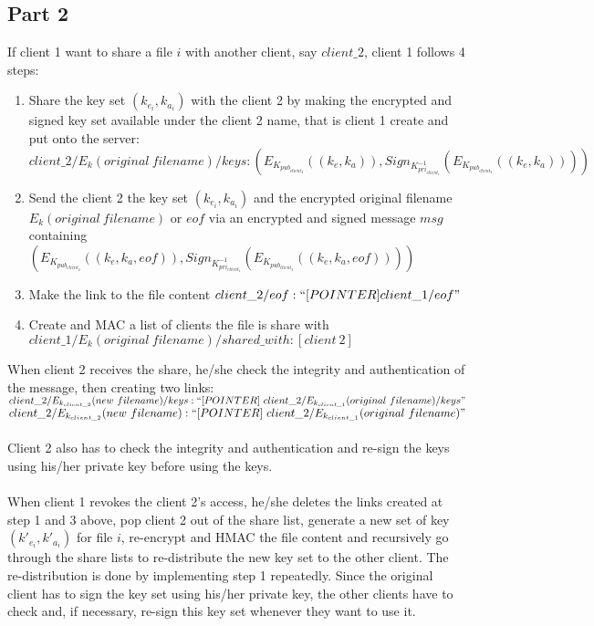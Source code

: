 \documentclass[a4paper, 11pt]{article}
\begin{document}
\subsection*{Part 2}
If client 1 want to share a file $i$ with another client, say $client\_2$, client 1 follows 4 steps:
%
\begin{enumerate}
	\item Share the key set $(k_{e_i},k_{a_i})$ with the client 2 by making the encrypted and signed key set available under the client 2 name, that is client 1 create and put onto the server:\\
	$client\_2/E_k(original\ filename)/keys : \left(E_{K_{pub_{client_2}}}((k_e, k_a)), Sign_{K^{-1}_{pri_{client_1}}}(E_{K_{pub_{client_2}}}((k_e, k_a)))\right)$
	\item Send the client 2 the key set $(k_{e_i},k_{a_i})$ and the encrypted original filename 	$E_k(original\ filename)$ or $eof$ via an encrypted and signed message $msg$ containing\\ $\left(E_{K_{pub_{client_2}}}((k_e, k_a, eof)), Sign_{K^{-1}_{pri_{client_1}}}(E_{K_{pub_{client_2}}}((k_e, k_a, eof)))\right)$
	\item Make the link to the file content $client\_2/eof : ``[POINTER] client\_1/eof"$
	\item Create and MAC a list of clients the file is share with\\
	$client\_1/E_k(original\ filename)/shared\_with : [client\ 2]$
\end{enumerate}
%
When client 2 receives the share, he/she check the integrity and authentication of the message, then creating two links:\\
$client\_2/E_{k_{client\_2}}(new\ filename)/keys : ``[POINTER]\ client\_2/E_{k_{client\_1}}(original\ filename)/keys"$\\
$client\_2/E_{k_{client\_2}}(new\ filename) : ``[POINTER]\ client\_2/E_{k_{client\_1}}(original\ filename)"$\\
\\
Client 2 also has to check the integrity and authentication and re-sign the keys using his/her private key before using the keys.\\
\\
When client 1 revokes the client 2's access, he/she deletes the links created at step 1 and 3 above, pop client 2 out of the share list, generate a new set of key $(k'_{e_i},k'_{a_i})$ for file $i$, re-encrypt and HMAC the file content and recursively go through the share lists to re-distribute the new key set to the other client. The re-distribution is done by implementing step 1 repeatedly. Since the original client has to sign the key set using his/her private key, the other clients have to check and, if necessary, re-sign this key set whenever they want to use it.\\
\end{document}
